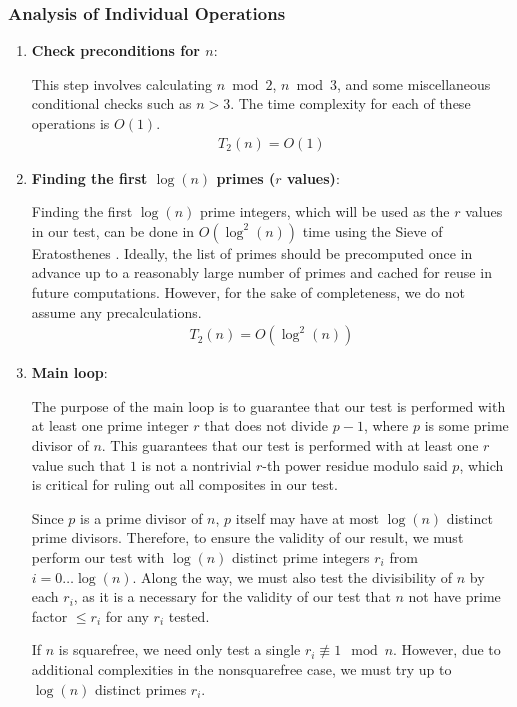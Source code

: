 \documentclass{article}
\theoremstyle{plain}
\theoremstyle{definition}
\newcommand{\D}{r}
\begin{document}
\subsubsection{Analysis of Individual Operations}
\begin{enumerate}[label*=\arabic*.]
    \item \textbf{Check preconditions for $n$}:
    
    This step involves calculating $n \bmod{2}$, $n \bmod{3}$, and some miscellaneous conditional checks such as $n > 3$. The time complexity for each of these operations is $O(1)$.
    \begin{align}
        T_2(n) = O(1)
    \end{align}
    
    \item \textbf{Finding the first $\log(n)$ primes ($\D$ values)}:
    
    Finding the first $\log(n)$ prime integers, which will be used as the $\D$ values in our test, can be done in $O(\log^2(n))$ time using the Sieve of Eratosthenes \cite{cormen2009algorithms}. Ideally, the list of primes should be precomputed once in advance up to a reasonably large number of primes and cached for reuse in future computations. However, for the sake of completeness, we do not assume any precalculations.
    \begin{align}
        T_2(n) = O(\log^2(n))
    \end{align}
        
    \item \textbf{Main loop}:
    
    The purpose of the main loop is to guarantee that our test is performed with at least one prime integer $\D$ that does not divide $p-1$, where $p$ is some prime divisor of $n$. This guarantees that our test is performed with at least one $\D$ value such that $1$ is not a nontrivial $\D$-th power residue modulo said $p$, which is critical for ruling out all composites in our test.
    
    Since $p$ is a prime divisor of $n$, $p$ itself may have at most $\log(n)$ distinct prime divisors. Therefore, to ensure the validity of our result, we must perform our test with $\log(n)$ distinct prime integers $\D_i$ from $i=0\ldots\log(n)$. Along the way, we must also test the divisibility of $n$ by each $\D_i$, as it is a necessary for the validity of our test that $n$ not have prime factor $\leq \D_i$ for any $\D_i$ tested.

    If $n$ is squarefree, we need only test a single $\D_i \not\equiv 1 \mod{n}$. However, due to additional complexities in the nonsquarefree case, we must try up to $\log(n)$ distinct primes $\D_i$.


\end{enumerate}
\end{document}
